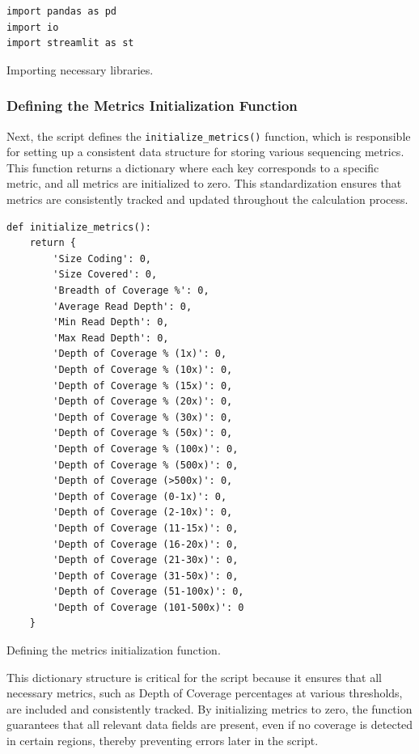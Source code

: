 \begin{longlisting}
\begin{verbatim}
import pandas as pd
import io
import streamlit as st
\end{verbatim}
\caption{Importing necessary libraries.}
\label{lbl:metrics_import}
\end{longlisting}

\subsubsection{\textbf{Defining the Metrics Initialization Function}}

Next, the script defines the \texttt{initialize\_metrics()} function, which is responsible for setting up a consistent data structure for storing various sequencing metrics. This function returns a dictionary where each key corresponds to a specific metric, and all metrics are initialized to zero. This standardization ensures that metrics are consistently tracked and updated throughout the calculation process.

\begin{longlisting}
\begin{verbatim}
def initialize_metrics():
    return {
        'Size Coding': 0,
        'Size Covered': 0,
        'Breadth of Coverage %': 0,
        'Average Read Depth': 0,
        'Min Read Depth': 0,
        'Max Read Depth': 0,
        'Depth of Coverage % (1x)': 0,
        'Depth of Coverage % (10x)': 0,
        'Depth of Coverage % (15x)': 0,
        'Depth of Coverage % (20x)': 0,
        'Depth of Coverage % (30x)': 0,
        'Depth of Coverage % (50x)': 0,
        'Depth of Coverage % (100x)': 0,
        'Depth of Coverage % (500x)': 0,
        'Depth of Coverage (>500x)': 0,
        'Depth of Coverage (0-1x)': 0,
        'Depth of Coverage (2-10x)': 0,
        'Depth of Coverage (11-15x)': 0,
        'Depth of Coverage (16-20x)': 0,
        'Depth of Coverage (21-30x)': 0,
        'Depth of Coverage (31-50x)': 0,
        'Depth of Coverage (51-100x)': 0,
        'Depth of Coverage (101-500x)': 0
    }
\end{verbatim}
\caption{Defining the metrics initialization function.}
\label{lbl:metrics_init}
\end{longlisting}

This dictionary structure is critical for the script because it ensures that all necessary metrics, such as Depth of Coverage percentages at various thresholds, are included and consistently tracked. By initializing metrics to zero, the function guarantees that all relevant data fields are present, even if no coverage is detected in certain regions, thereby preventing errors later in the script.

